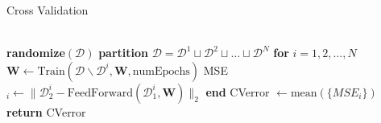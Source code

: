 \documentclass[prl,amsmath,amssymb,floatfix,superscriptaddress,notitlepage,twocolumn]{revtex4}
\begin{document}
\begin{algorithm}[H]
\caption{Cross Validation}\label{cross_val}
\begin{algorithmic}[]
\\

\State \textbf{randomize}$(\mathcal{D})$
\State \textbf{partition} $\mathcal{D}=\mathcal{D}^1\sqcup\mathcal{D}^2\sqcup\dots\sqcup\mathcal{D}^N$
\State \textbf{for } $i=1,2,\dots,N$
\State \hspace{.25cm} $\textbf{W}\gets \text{Train}(\mathcal{D\backslash \mathcal{D}}^i, \textbf{W}, \text{numEpochs})$
\State \hspace{.25cm} MSE$_i\gets\|\mathcal{D}^i_2-\text{FeedForward}(\mathcal{D}^i_1,\textbf{W})\|_2$
\State \textbf{end}
\State CVerror $\gets \text{mean}(\{MSE_i\})$\\
\State \textbf{return} CVerror\\

\EndProcedure
\end{algorithmic}
\end{algorithm}
\end{document}
